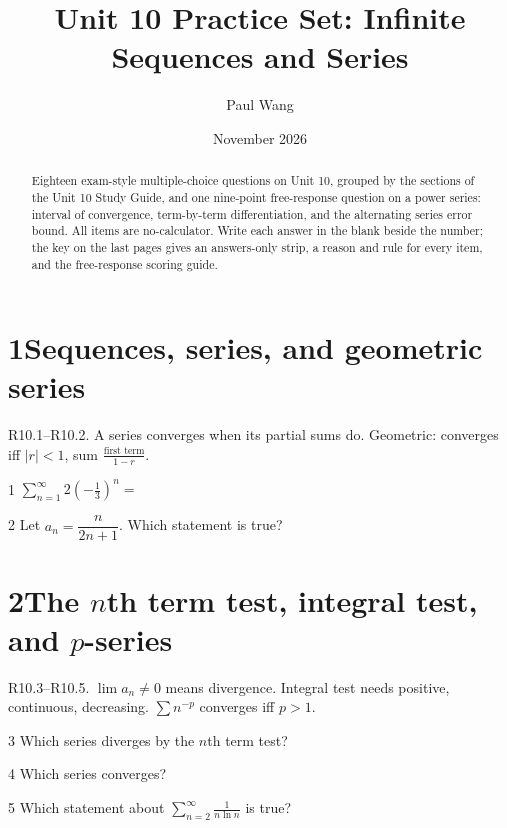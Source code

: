\documentclass{apcalc}
\title{Unit 10 Practice Set: Infinite Sequences and Series}
\author{Paul Wang}
\date{November 2026}
\begin{document}
\maketitle
\begin{abstract}
Eighteen exam-style multiple-choice questions on Unit 10, grouped by the sections of the Unit 10 Study Guide, and one nine-point free-response question on a power series: interval of convergence, term-by-term differentiation, and the alternating series error bound. All items are no-calculator. Write each answer in the blank beside the number; the key on the last pages gives an answers-only strip, a reason and rule for every item, and the free-response scoring guide.
\end{abstract}
\section*{1\quad Sequences, series, and geometric series}
\begin{setrule}R10.1–R10.2. A series converges when its partial sums do. Geometric: converges iff $|r|<1$, sum $\frac{\text{first term}}{1-r}$.\end{setrule}
\begin{q}{1}
$\displaystyle\sum_{n=1}^{\infty}2\left(-\frac13\right)^n=$
\end{q}
\begin{q}{2}
Let $a_n=\dfrac{n}{2n+1}$. Which statement is true?
\end{q}
\section*{2\quad The $n$th term test, integral test, and $p$-series}
\begin{setrule}R10.3–R10.5. $\lim a_n\neq0$ means divergence. Integral test needs positive, continuous, decreasing. $\sum n^{-p}$ converges iff $p>1$.\end{setrule}
\begin{q}{3}
Which series diverges by the $n$th term test?
\end{q}
\begin{q}{4}
Which series converges?
\end{q}
\begin{q}{5}
Which statement about $\displaystyle\sum_{n=2}^{\infty}\frac{1}{n\ln n}$ is true?
\end{q}
\end{document}
